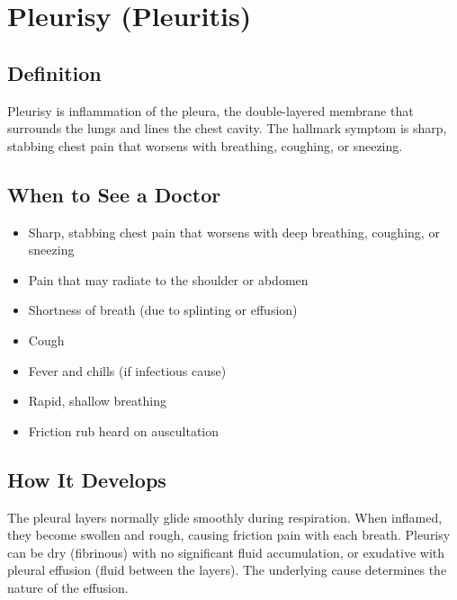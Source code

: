 \chapter{Pleurisy (Pleuritis)}

\section*{Definition}
Pleurisy is inflammation of the pleura, the double-layered membrane that surrounds the lungs and lines the chest cavity. The hallmark symptom is sharp, stabbing chest pain that worsens with breathing, coughing, or sneezing.

\section*{When to See a Doctor}
\begin{itemize}
\item Sharp, stabbing chest pain that worsens with deep breathing, coughing, or sneezing
\item Pain that may radiate to the shoulder or abdomen
\item Shortness of breath (due to splinting or effusion)
\item Cough
\item Fever and chills (if infectious cause)
\item Rapid, shallow breathing
\item Friction rub heard on auscultation
\end{itemize}

\section*{How It Develops}
The pleural layers normally glide smoothly during respiration. When inflamed, they become swollen and rough, causing friction pain with each breath. Pleurisy can be dry (fibrinous) with no significant fluid accumulation, or exudative with pleural effusion (fluid between the layers). The underlying cause determines the nature of the effusion.

